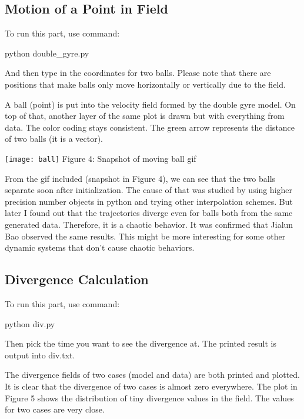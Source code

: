 \documentclass[12pt]{article}
\begin{document}
\subsection{Motion of a Point in Field}
To run this part, use command:

\begin{center}
python double\_gyre.py 
\end{center} 

And then type in the coordinates for two balls. Please note that there are positions that make balls only move horizontally or vertically due to the field.

A ball (point) is put into the velocity field formed by the double gyre model. On top of that, another layer of the same plot is drawn but with everything from data. The color coding stays consistent. The green arrow represents the distance of two balls (it is a vector).

\begin{center}
\texttt{[image: ball]}
\small Figure 4: Snapshot of moving ball gif
\end{center}


From the gif included (snapshot in Figure 4), we can see that the two balls separate soon after initialization. The cause of that was studied by using higher precision number objects in python and trying other interpolation schemes. But later I found out that the trajectories diverge even for balls both from the same generated data. Therefore, it is a chaotic behavior. It was confirmed that Jialun Bao observed the same results. This might be more interesting for some other dynamic systems that don't cause chaotic behaviors.


\subsection{Divergence Calculation}
To run this part, use command:

\begin{center}
python div.py
\end{center} 
Then pick the time you want to see the divergence at. The printed result is output into div.txt.

The divergence fields of two cases (model and data) are both printed and plotted. It is clear that the divergence of two cases is almost zero everywhere. The plot in Figure 5 shows the distribution of tiny divergence values in the field. The values for two cases are very close.
\end{document}
